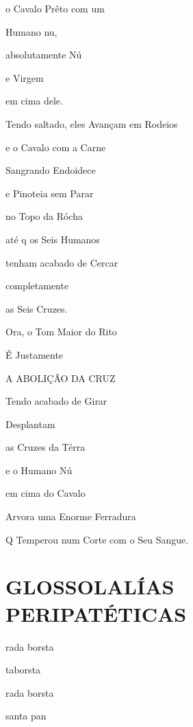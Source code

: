 o Cavalo Prêto com um

Humano nu, 

absolutamente Nú

e Virgem

em cima dele.

Tendo saltado, eles Avançam em Rodeios

e o Cavalo com a Carne

Sangrando Endoidece

e Pinoteia sem Parar

no Topo da Rócha

até q os Seis Humanos

tenham acabado de Cercar

completamente

as Seis Cruzes.


Ora, o Tom Maior do Rito

É Justamente

A ABOLIÇÃO DA CRUZ

Tendo acabado de Girar

Desplantam

as Cruzes da Térra

e o Humano Nú

em cima do Cavalo

Arvora uma Enorme Ferradura

Q Temperou num Corte com o Seu Sangue.



\mbox{}\vspace*{\fill}
\section*{GLOSSOLALÍAS~ PERIPATÉTICAS}

\begin{center}

rada borsta

taborsta

rada borsta

santa pan
\end{center}


